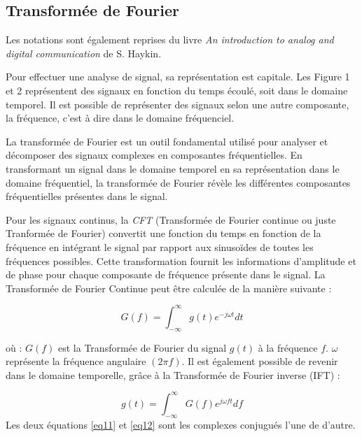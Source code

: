 \subsection{Transformée de Fourier}

Les notations sont également reprises du livre \textit{An introduction to analog and digital communication} de S. Haykin\cite{book1}.

\vspace{0.1cm}

Pour effectuer une analyse de signal, sa représentation est capitale. Les Figure 1 et 2 représentent des signaux en fonction du temps écoulé, soit dans le domaine temporel. Il est possible de représenter des signaux selon une autre composante, la fréquence, c'est à dire dans le domaine fréquenciel.

\vspace{0.1cm}

La transformée de Fourier est un outil fondamental utilisé pour analyser et décomposer des signaux complexes en composantes fréquentielles. En transformant un signal dans le domaine temporel en sa représentation dans le domaine fréquentiel, la transformée de Fourier révèle les différentes composantes fréquentielles présentes dans le signal.

\vspace{0.1cm}

Pour les signaux continus, la \textit{CFT} (Transformée de Fourier continue ou juste Tranformée de Fourier) convertit une fonction du temps en fonction de la fréquence en intégrant le signal par rapport aux sinusoïdes de toutes les fréquences possibles. Cette transformation fournit les informations d'amplitude et de phase pour chaque composante de fréquence présente dans le signal. La Transformée de Fourier Continue peut être calculée de la manière suivante :  

\begin{equation}\label{eq11}
G(f) = \int_{-\infty}^{\infty} g(t)e^{-j\omega t} dt
\end{equation}

où : $G(f)$ est la Transformée de Fourier du signal $g(t)$ à la fréquence $f$. $\omega$ représente la fréquence angulaire $(2 \pi f)$.
Il est également possible de revenir dans le domaine temporelle, grâce à la Transformée de Fourier inverse (IFT) :

\begin{equation}\label{eq12}
g(t) = \int_{-\infty}^{\infty} G(f)e^{j\omega ft} df
\end{equation}
Les deux équations \ref{eq11} et \ref{eq12} sont les complexes conjugués l'une de d'autre.

